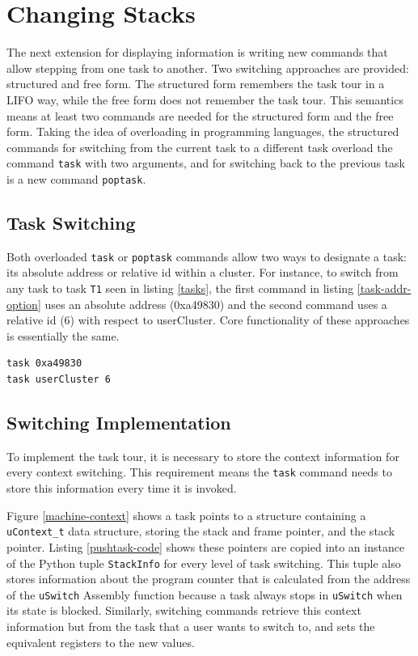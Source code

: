 \section{Changing Stacks}
The next extension for displaying information is writing new commands that allow
stepping from one \uCPPS task to another. Two switching approaches are
provided: structured and free form. The structured form remembers the task tour in a
LIFO way, while the free form does not remember the task tour. This semantics means
at least two commands are needed for the structured form and the free form.
Taking the idea of overloading in programming languages, the structured
commands for switching from the current task to a different task overload the
command \verb|task| with two arguments, and
for switching back to the previous task is a new command \verb|poptask|.

\subsection{Task Switching}
Both overloaded \verb|task| or \verb|poptask| commands allow two ways to
designate a task: its absolute address or relative id within a cluster. For
instance, to switch from any task to task \verb|T1| seen in listing
\ref{tasks}, the first command in listing \ref{task-addr-option} uses an
absolute address (0xa49830) and the second command uses a relative id (6) with
respect to userCluster. Core functionality of these approaches is essentially the same.
\begin{lstlisting}[caption={task command option}, label={task-addr-option}, basicstyle=\small\tt]
task 0xa49830
task userCluster 6
\end{lstlisting}

\subsection{Switching Implementation}
To implement the task tour, it is necessary to store the context information
for every context switching. This requirement means the \verb|task| command
needs to store this information every time it is
invoked.

Figure \ref{machine-context} shows a task points to a structure containing a
\verb|uContext_t| data structure, storing the stack and frame pointer, and the
stack pointer. Listing \ref{pushtask-code} shows these pointers are copied into
an instance of the Python tuple \verb|StackInfo| for every level of task
switching. This tuple also stores information about the program counter that is
calculated from the address of the \verb|uSwitch| Assembly function because a
task always stops in \verb|uSwitch| when its state is blocked.  Similarly,
switching commands retrieve this context information but from the task that
a user wants to switch to, and sets the equivalent registers to the new values.


